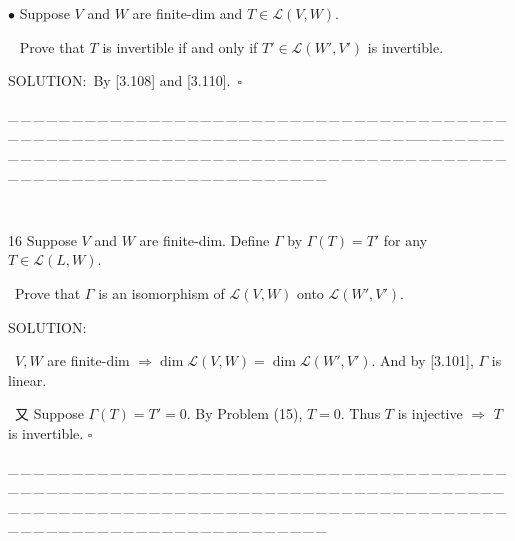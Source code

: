\documentclass[a4paper, 11pt, UTF8]{article}
\def\Lm{\mathcal{L}}
\begin{document}
\begin{large}
{\small$\bullet$} {\timessl\Large
Suppose $V$ and $W$ are finite-dim and $T\in\Lm(V,W)$.}\par\,\,\,
{\timessl\Large
Prove that $T$ is invertible if and only if $T'\in\Lm(W',V')$ is invertible.}\par
{\timesbf S\footnotesize{OLUTION:}}\,\,\,By [3.108] and [3.110].\,\,\,$\square$\par
 {\tiny \_\,\_\,\_\,\_\,\_\,\_\,\_\,\_\,\_\,\_\,\_\,\_\,\_\,\_\,\_\,\_\,\_\,\_\,\_\,\_\,\_\,\_\,\_\,\_\,\_\,\_\,\_\,\_\,\_\,\_\,\_\,\_\,\_\,\_\,\_\,\_\,\_\,\_\,\_\,\_\,\_\,\_\,\_\,\_\,\_\,\_\,\_\,\_\,\_\,\_\,\_\,\_\,\_\,\_\,\_\,\_\,\_\,\_\,\_\,\_\,\_\,\_\,\_\,\_\,\_\,\_\,\_\,\_\,\_\,\_\,\_\_\,\_\,\_\,\_\,\_\,\_\,\_\,\_\,\_\,\_\,\_\,\_\,\_\,\_\,\_\,\_\,\_\,\_\,\_\,\_\,\_\,\_\,\_\,\_\,\_\,\_\,\_\,\_\,\_\,\_\,\_\,\_\,\_\,\_\,\_\,\_\,\_\,\_\,\_\,\_\,\_\,\_\,\_\,\_\,\_\,\_\,\_\,\_\,\_\,\_\,\_\,\_\,\_\,\_\,\_\,\_\,\_\,\_\,\_\,\_\,\_\,\_\,\_\,\_\,\_\,\_\,\_\,\_\,\_\,\_\,\_}{\tiny\,\par}
{\timesbf\Large 16} {\timessl\Large
Suppose $V$ and $W$ are finite-dim. Define $\Gamma$ by $\Gamma(T)=T'$ for any $T\in\Lm(L,W)$. }\par\quad
{\timessl \Large\, Prove that $\Gamma$ is an isomorphism of $\Lm(V,W)$ onto $\Lm(W',V')$.
}\par
{\timesbf S\footnotesize{OLUTION:}}\par\quad\,
$V,W$ are finite-dim $\Rightarrow\dim\Lm(V,W)=\dim\Lm(W',V')$. And by [3.101], $\Gamma$ is linear.\par\quad\, 
又 Suppose $\Gamma(T)=T'=0$. By Problem (15), $T=0$. Thus $T$ is injective $\Rightarrow$ $T$ is invertible. \quad$\square$

 {\tiny \_\,\_\,\_\,\_\,\_\,\_\,\_\,\_\,\_\,\_\,\_\,\_\,\_\,\_\,\_\,\_\,\_\,\_\,\_\,\_\,\_\,\_\,\_\,\_\,\_\,\_\,\_\,\_\,\_\,\_\,\_\,\_\,\_\,\_\,\_\,\_\,\_\,\_\,\_\,\_\,\_\,\_\,\_\,\_\,\_\,\_\,\_\,\_\,\_\,\_\,\_\,\_\,\_\,\_\,\_\,\_\,\_\,\_\,\_\,\_\,\_\,\_\,\_\,\_\,\_\,\_\,\_\,\_\,\_\,\_\,\_\_\,\_\,\_\,\_\,\_\,\_\,\_\,\_\,\_\,\_\,\_\,\_\,\_\,\_\,\_\,\_\,\_\,\_\,\_\,\_\,\_\,\_\,\_\,\_\,\_\,\_\,\_\,\_\,\_\,\_\,\_\,\_\,\_\,\_\,\_\,\_\,\_\,\_\,\_\,\_\,\_\,\_\,\_\,\_\,\_\,\_\,\_\,\_\,\_\,\_\,\_\,\_\,\_\,\_\,\_\,\_\,\_\,\_\,\_\,\_\,\_\,\_\,\_\,\_\,\_\,\_\,\_\,\_\,\_\,\_\,\_}\par


\end{large}
\end{document}
